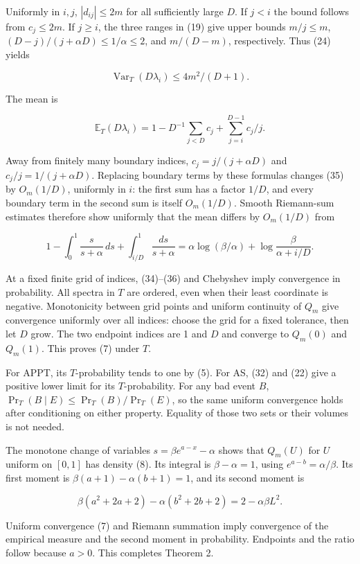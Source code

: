 \documentclass[
  11pt,
]{article}
\begin{document}
Uniformly in \(i,j\), \(|d_{ij}|\leq2m\) for all sufficiently large
\(D\). If \(j<i\) the bound follows from \(c_j\leq2m\). If \(j\geq i\),
the three ranges in (19) give upper bounds \(m/j\leq m\),
\((D-j)/(j+\alpha D)\leq1/\alpha\leq2\), and \(m/(D-m)\), respectively.
Thus (24) yields

\[
\operatorname{Var}_T(D\lambda_i)\leq4m^2/(D+1).
\tag{34}
\]

The mean is

\[
\mathbb E_T(D\lambda_i)=1-D^{-1}\sum_{j<D}c_j+
                         \sum_{j=i}^{D-1}c_j/j.
\tag{35}
\]

Away from finitely many boundary indices, \(c_j=j/(j+\alpha D)\) and
\(c_j/j=1/(j+\alpha D)\). Replacing boundary terms by these formulas
changes (35) by \(O_m(1/D)\), uniformly in \(i\): the first sum has a
factor \(1/D\), and every boundary term in the second sum is itself
\(O_m(1/D)\). Smooth Riemann-sum estimates therefore show uniformly that
the mean differs by \(O_m(1/D)\) from

\[
1-\int_0^1\frac{s}{s+\alpha}\,ds+\int_{i/D}^1\frac{ds}{s+\alpha}
=\alpha\log(\beta/\alpha)+\log\frac\beta{\alpha+i/D}.
\tag{36}
\]

At a fixed finite grid of indices, (34)--(36) and Chebyshev imply
convergence in probability. All spectra in \(T\) are ordered, even when
their least coordinate is negative. Monotonicity between grid points and
uniform continuity of \(Q_m\) give convergence uniformly over all
indices: choose the grid for a fixed tolerance, then let \(D\) grow. The
two endpoint indices are 1 and \(D\) and converge to \(Q_m(0)\) and
\(Q_m(1)\). This proves (7) under \(T\).

For APPT, its \(T\)-probability tends to one by (5). For AS, (32) and
(22) give a positive lower limit for its \(T\)-probability. For any bad
event \(B\), \(\Pr_T(B\mid E)\leq\Pr_T(B)/\Pr_T(E)\), so the same
uniform convergence holds after conditioning on either property.
Equality of those two sets or their volumes is not needed.

The monotone change of variables \(s=\beta e^{a-x}-\alpha\) shows that
\(Q_m(U)\) for \(U\) uniform on \([0,1]\) has density (8). Its integral
is \(\beta-\alpha=1\), using \(e^{a-b}=\alpha/\beta\). Its first moment
is \(\beta(a+1)-\alpha(b+1)=1\), and its second moment is

\[
\beta(a^2+2a+2)-\alpha(b^2+2b+2)=2-\alpha\beta L^2.
\tag{37}
\]

Uniform convergence (7) and Riemann summation imply convergence of the
empirical measure and the second moment in probability. Endpoints and
the ratio follow because \(a>0\). This completes Theorem 2.
\end{document}
